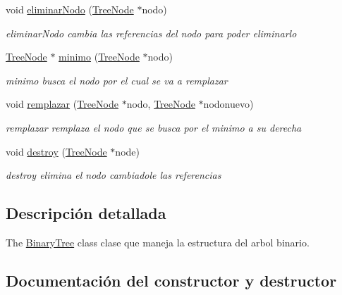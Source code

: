 \begin{DoxyCompactItemize}
void \mbox{\hyperlink{class_binary_tree_ae67035ec37e83ccbceabb71826226e8d}{eliminar\+Nodo}} (\mbox{\hyperlink{class_tree_node}{Tree\+Node}} $\ast$nodo)
\begin{DoxyCompactList}\small\item\em eliminar\+Nodo cambia las referencias del nodo para poder eliminarlo \end{DoxyCompactList}\item 
\mbox{\hyperlink{class_tree_node}{Tree\+Node}} $\ast$ \mbox{\hyperlink{class_binary_tree_abcee209ca30b59708c0ef9f22863944c}{minimo}} (\mbox{\hyperlink{class_tree_node}{Tree\+Node}} $\ast$nodo)
\begin{DoxyCompactList}\small\item\em minimo busca el nodo por el cual se va a remplazar \end{DoxyCompactList}\item 
void \mbox{\hyperlink{class_binary_tree_a9fe0609a3ea42f1e3062e25e43fea81b}{remplazar}} (\mbox{\hyperlink{class_tree_node}{Tree\+Node}} $\ast$nodo, \mbox{\hyperlink{class_tree_node}{Tree\+Node}} $\ast$nodonuevo)
\begin{DoxyCompactList}\small\item\em remplazar remplaza el nodo que se busca por el minimo a su derecha \end{DoxyCompactList}\item 
void \mbox{\hyperlink{class_binary_tree_adca59e6c9ff7a3c87aa35955ba7897ef}{destroy}} (\mbox{\hyperlink{class_tree_node}{Tree\+Node}} $\ast$node)
\begin{DoxyCompactList}\small\item\em destroy elimina el nodo cambiadole las referencias \end{DoxyCompactList}\end{DoxyCompactItemize}


\subsection{Descripción detallada}
The \mbox{\hyperlink{class_binary_tree}{Binary\+Tree}} class clase que maneja la estructura del arbol binario. 

\subsection{Documentación del constructor y destructor}
\mbox{\label{class_binary_tree_adf45bce605436b26c353b87e27bffe50}} 
